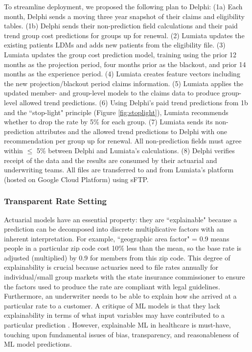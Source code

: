 \documentclass[letterpaper]{article}
\begin{document}
To streamline deployment, we proposed the following plan to Delphi:
(1a) Each month, Delphi sends a moving three year snapshot of their claims and eligibility tables.
(1b) Delphi sends their non-prediction field calculations and their paid trend group cost predictions for groups up for renewal.
(2) Lumiata updates the existing patients LDMs and adds new patients from the eligibility file.
(3) Lumiata updates the group cost prediction model, training using the prior 12 months as the projection period, four months prior as the blackout, and prior 14 months as the experience period.
(4) Lumiata creates feature vectors including the new projection/blackout period claims information.
(5) Lumiata applies the updated member- and group-level models to the claims data to produce group-level allowed trend predictions.
(6) Using Delphi's paid trend predictions from 1b and the ``stop-light" principle (Figure \ref{fig:stoplight}), Lumiata recommends whether to drop the rate by 5\% for each group.
(7) Lumiata sends its non-prediction attributes and the allowed trend predictions to Delphi with one recommendation per group up for renewal. All non-prediction fields must agree within $\leq$ 5\% between Delphi and Lumiata's calculations.
(8) Delphi verifies receipt of the data and the results are consumed by their actuarial and underwriting teams.
All files are transferred to and from Lumiata's platform (hosted on Google Cloud Platform) using sFTP.

\subsubsection{Transparent Rate Setting}\label{sec:deployment}
Actuarial models have an essential property: they are ``explainable" because a prediction can be decomposed into discrete multiplicative factors with an inherent interpretation.  For example, ``geographic area factor" = 0.9 means people in a particular zip code cost 10\% less than the mean, so the base rate is adjusted (multiplied) by 0.9 for members from this zip code.  This degree of explainability is crucial because actuaries need to file rates annually for individual/small group markets with the state insurance commissioner to ensure the factors used to produce the rate are compliant with legal guidelines.  Furthermore, an underwriter needs to be able to explain how she arrived at a particular rate to a customer.
A critique of ML models is that they lack explainability in terms of what input variables may have contributed to a particular prediction \cite{xai}.  However, explainable ML in healthcare is must-have, touching upon fundamental issues of bias, transparency, and reasonableness of ML model predictions.
\end{document}

